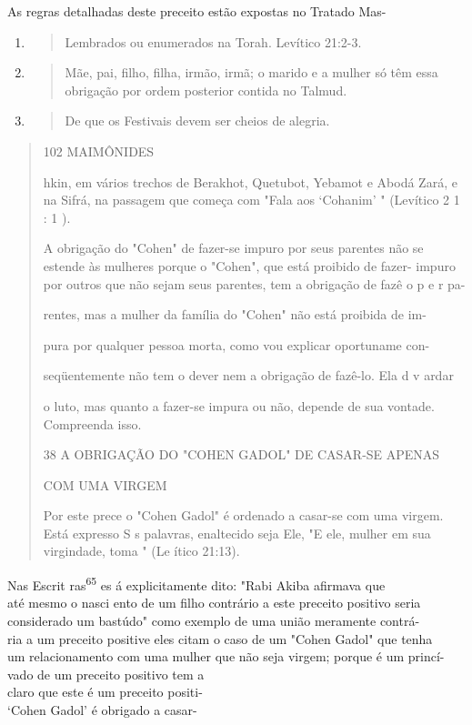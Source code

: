 As regras detalhadas deste preceito estão expostas no Tratado Mas-

\begin{enumerate}
\def\labelenumi{\arabic{enumi}.}
\setcounter{enumi}{60}
\item
  \begin{quote}
  Lembrados ou enumerados na Torah. Levítico 21:2-3.
  \end{quote}
\item
  \begin{quote}
  Mãe, pai, filho, filha, irmão, irmã; o marido e a mulher só têm essa
  obrigação por ordem poste­rior contida no Talmud.
  \end{quote}
\item
  \begin{quote}
  De que os Festivais devem ser cheios de alegria.
  \end{quote}
\end{enumerate}

\begin{quote}
102 MAIMÔNIDES

hkin, em vários trechos de Berakhot, Quetubot, Yebamot e Abodá Zará, e
na Sifrá, na passagem que começa com "Fala aos `Cohanim' " (Levítico 2 1
: 1 ).

A obrigação do "Cohen" de fazer-se impuro por seus parentes não se
estende às mulheres porque o "Cohen", que está proibido de fazer-
impu­ro por outros que não sejam seus parentes, tem a obrigação de fazê
o p e r pa-

rentes, mas a mulher da família do "Cohen" não está proibida de im-

pura por qualquer pessoa morta, como vou explicar oportuname con-

seqüentemente não tem o dever nem a obrigação de fazê-lo. Ela d v ardar

o luto, mas quanto a fazer-se impura ou não, depende de sua vontade.
Com­preenda isso.

38 A OBRIGAÇÃO DO "COHEN GADOL" DE CASAR-SE APENAS

COM UMA VIRGEM

Por este prece o "Cohen Gadol" é ordenado a casar-se com uma virgem.
Está expresso S s palavras, enaltecido seja Ele, "E ele, mulher em sua
virgindade, toma " (Le ítico 21:13).
\end{quote}

Nas Escrit ras\textsuperscript{65} es á explicitamente dito: "Rabi Akiba
afirmava que\\
até mesmo o nasci ento de um filho contrário a este preceito positivo
seria\\
considerado um bastúdo" como exemplo de uma união meramente contrá-\\
ria a um preceito positive eles citam o caso de um "Cohen Gadol" que
tenha\\
um relacionamento com uma mulher que não seja virgem; porque é um
princí-\\
vado de um preceito positivo tem a\\
claro que este é um preceito positi-\\
`Cohen Gadol' é obrigado a casar-


